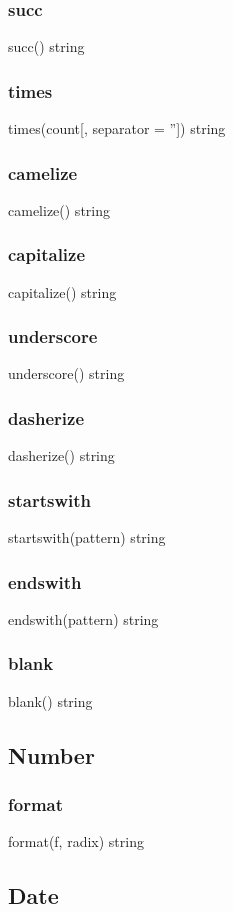 {{\subsubsection*{succ}
succ() \rightarrow string
\subsubsection*{times}
times(count[, separator = '']) \rightarrow string
\subsubsection*{camelize}
camelize() \rightarrow string
\subsubsection*{capitalize}
capitalize() \rightarrow string
\subsubsection*{underscore}
underscore() \rightarrow string
\subsubsection*{dasherize}
dasherize() \rightarrow string
\subsubsection*{startswith}
startswith(pattern) \rightarrow string
\subsubsection*{endswith}
endswith(pattern) \rightarrow string
\subsubsection*{blank}
blank() \rightarrow string

\subsection{Number}
\subsubsection*{format}
format(f, radix) \rightarrow string

\subsection{Date}
}}
